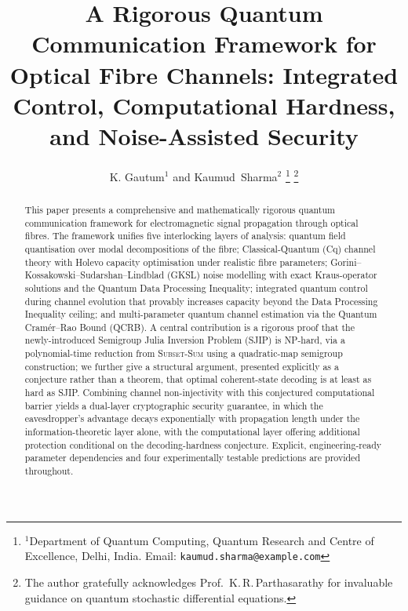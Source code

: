 \documentclass[journal,twocolumn]{IEEEtran}
\theoremstyle{definition}
\theoremstyle{plain}
\begin{document}
\title{A Rigorous Quantum Communication Framework for Optical
Fibre Channels: Integrated Control, Computational Hardness,
and Noise-Assisted Security}

\author{K. Gautum$^{1}$ and Kaumud~Sharma$^{2}$%
  \thanks{$^{1}$Department of Quantum Computing, Quantum Research
    and Centre of Excellence, Delhi, India.
    Email: \texttt{kaumud.sharma@example.com}}%
  \thanks{The author gratefully acknowledges Prof.~K.\,R.\,Parthasarathy
    for invaluable guidance on quantum stochastic differential equations.}%
}

\maketitle




\begin{abstract}
This paper presents a comprehensive and mathematically rigorous
quantum communication framework for electromagnetic signal propagation
through optical fibres.  The framework unifies five interlocking
layers of analysis: quantum field quantisation over modal
decompositions of the fibre; Classical-Quantum (Cq) channel theory
with Holevo capacity optimisation under realistic fibre parameters;
Gorini--Kossakowski--Sudarshan--Lindblad (GKSL) noise modelling with
exact Kraus-operator solutions and the Quantum Data Processing
Inequality; integrated quantum control during channel evolution that
provably increases capacity beyond the Data Processing Inequality
ceiling; and multi-parameter quantum channel estimation via the
Quantum Cram\'{e}r--Rao Bound (QCRB).  A central contribution is a rigorous proof that the
newly-introduced Semigroup Julia Inversion Problem (SJIP) is
NP-hard, via a polynomial-time reduction from \textsc{Subset-Sum}
using a quadratic-map semigroup construction; we further give a
structural argument, presented explicitly as a conjecture rather
than a theorem, that optimal coherent-state decoding is at least as
hard as SJIP.  Combining channel non-injectivity with this
conjectured computational barrier yields a dual-layer cryptographic
security guarantee, in which the eavesdropper's advantage decays
exponentially with propagation length under the information-theoretic
layer alone, with the computational layer offering additional
protection conditional on the decoding-hardness conjecture.  Explicit, engineering-ready
parameter dependencies and four experimentally testable predictions
are provided throughout.
\end{abstract}
\end{document}
